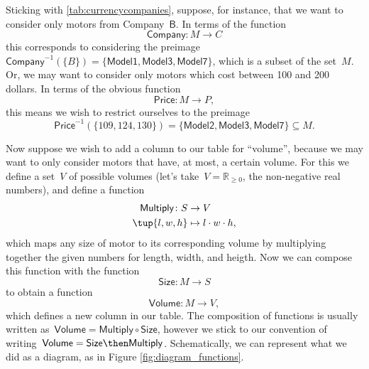 Sticking with \cref{tab:currencycompanies}, suppose, for instance, that we want to consider only motors from Company~$\mathsf{B}$. In terms of the function
\begin{equation*}
\mathsf{Company}\colon M \to C
\end{equation*}
this corresponds to considering the preimage~$\mathsf{Company}^{-1}(\{ B \}) = \{ \mathsf{Model1}, \mathsf{Model3}, \mathsf{Model7} \}$, which is a subset of the set~$M$. Or, we may want to consider only motors which cost between 100 and 200 dollars. In terms of the obvious function
\begin{equation*}
\mathsf{Price}\colon M \to P,
\end{equation*}
this means we wish to restrict ourselves to the preimage
\begin{equation*}
\mathsf{Price}^{-1}(\{ 109, 124, 130\}) = \{ \mathsf{Model2}, \mathsf{Model3}, \mathsf{Model7} \} \subseteq M.
\end{equation*}

Now suppose we wish to add a column to our table for ``volume'', because we may want to only consider motors that have, at most, a certain volume. For this we define a set~$V$ of possible volumes (let's take~$V = \mathbb{R}_{\geq 0}$, the non-negative real numbers), and define a function
\begin{equation*}
\begin{aligned}
\mathsf{Multiply}\colon S &\to V\\
\tup{l, w, h} &\mapsto l \cdot w \cdot h,
\end{aligned}
\end{equation*}
which maps any size of motor to its corresponding volume by multiplying together the given numbers for length, width, and heigth.  Now we can compose this function with the function
\begin{equation*}
\mathsf{Size}\colon M \to S
\end{equation*}
to obtain a function
\begin{equation*}
\mathsf{Volume}\colon M \to V,
\end{equation*}
which defines a new column in our table. The composition of functions is usually written as~$\mathsf{Volume} = \mathsf{Multiply} \circ \mathsf{Size}$, however we stick to our convention of writing~$\mathsf{Volume} = \mathsf{Size} \then \mathsf{Multiply}$. Schematically, we can represent what we did as a diagram, as in Figure \cref{fig:diagram_functions}.



